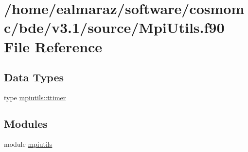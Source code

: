 \hypertarget{MpiUtils_8f90}{}\section{/home/ealmaraz/software/cosmomc/bde/v3.1/source/\+Mpi\+Utils.f90 File Reference}
\label{MpiUtils_8f90}
\subsection*{Data Types}
\begin{DoxyCompactItemize}
\item 
type \mbox{\hyperlink{structmpiutils_1_1ttimer}{mpiutils\+::ttimer}}
\end{DoxyCompactItemize}
\subsection*{Modules}
\begin{DoxyCompactItemize}
\item 
module \mbox{\hyperlink{namespacempiutils}{mpiutils}}
\end{DoxyCompactItemize}
